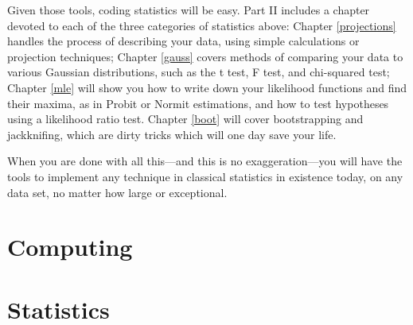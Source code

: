 \documentclass[12pt,notitlepage, openany]{book}
\begin{document}
Given those tools, coding statistics will be easy. Part II includes a chapter
devoted to each of the three categories of statistics above: Chapter \ref{projections}
handles the process of describing your data, using simple calculations
or projection techniques; Chapter
\ref{gauss} covers methods of comparing your data to various Gaussian
distributions, such as the t test, F test, and chi-squared test; Chapter
\ref{mle} will show you how to write down your likelihood functions and
find their maxima, as in Probit or Normit estimations, and how to test
hypotheses using a likelihood ratio test. Chapter \ref{boot} will cover
bootstrapping and jackknifing, which are dirty tricks which will one
day save your life.  

When you are done with all this---and this is no exaggeration---you will
have the tools to implement any technique in classical statistics in
existence today, on any data set, no matter how large or exceptional.

\part{Computing}





\part{Statistics}




%
\citeindexfalse
\nocite{*}
\backmatter


\printindex
\end{document}
